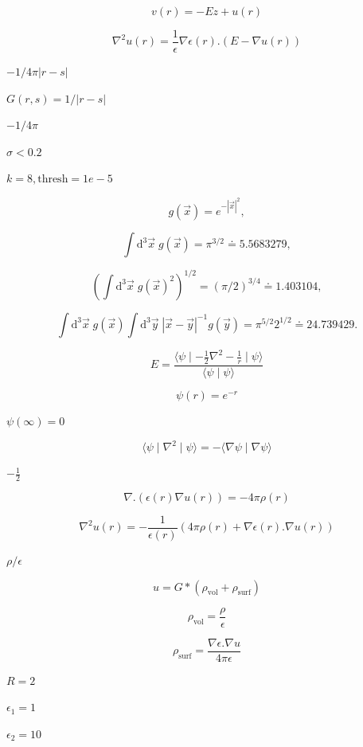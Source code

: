 \documentclass{article}
\begin{document}
\[
v(r) = - E z + u(r)
\]
\pagebreak

\[
   \nabla^2 u(r) = \frac{1}{\epsilon} \nabla \epsilon(r) .  \left(E - \nabla u(r) \right)
\]
\pagebreak

$-1 / 4 \pi |r-s|$
\pagebreak

$G(r,s) = 1/|r-s|$
\pagebreak

$-1/4\pi$
\pagebreak

$\sigma<0.2$
\pagebreak

$k=8, \mbox{thresh}=1e-5$
\pagebreak

\[ g(\vec{x}) = e^{-|\vec{x}|^2}, \]
\pagebreak

\[
   \int \mathrm{d}^3 \vec{x} \; g(\vec{x}) = \pi^{3/2} \doteq 5.5683279,
\]
\pagebreak

\[
   \left( \int \mathrm{d}^3 \vec{x} \; g(\vec{x})^2 \right)^{1/2} = (\pi/2)^{3/4} \doteq 1.403104,
\]
\pagebreak

\[
   \int \mathrm{d}^3 \vec{x} \; g(\vec{x}) \int \mathrm{d}^3 \vec{y} \; |\vec{x}-\vec{y}|^{-1} g(\vec{y}) = \pi^{5/2} 2^{1/2} \doteq 24.739429.
\]
\pagebreak

\[
    E = \frac{\langle \psi \mid - \frac{1}{2}  \nabla^2  - \frac{1}{r} \mid \psi \rangle}{\langle \psi \mid \psi \rangle}
\]
\pagebreak

\[
   \psi(r) = e^{-r}
\]
\pagebreak

$ \psi(\infty)=0 $
\pagebreak

\[
     \langle \psi \mid \nabla^2 \mid \psi \rangle = - \langle \nabla \psi \mid \nabla \psi \rangle
\]
\pagebreak

$-\frac{1}{2}$
\pagebreak

\[
\nabla . \left( \epsilon(r) \nabla u(r)  \right) = - 4 \pi \rho(r)
\]
\pagebreak

\[
   \nabla^2 u(r) = - \frac{1}{\epsilon(r)} \left( 4 \pi \rho(r) + \nabla \epsilon(r) .  \nabla u(r) \right)
\]
\pagebreak

$\rho / \epsilon$
\pagebreak

\[
   u = G * \left(\rho_{\mbox{vol}} + \rho_{\mbox{surf}} \right)
\]
\pagebreak

\[
   \rho_{\mbox{vol}} = \frac{\rho}{\epsilon}
\]
\pagebreak

\[
   \rho_{\mbox{surf}} = \frac{\nabla \epsilon .  \nabla u}{4 \pi \epsilon}
\]
\pagebreak

$R=2$
\pagebreak

$\epsilon_1 = 1$
\pagebreak

$\epsilon_2 = 10$
\pagebreak
\end{document}
